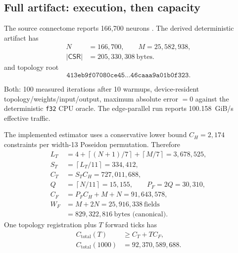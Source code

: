 \documentclass[9pt,twocolumn]{extarticle}
\newcommand{\ceil}[1]{\left\lceil #1\right\rceil}
\newcommand{\code}[1]{\texttt{#1}}
\begin{document}
\subsection{Full artifact: execution, then capacity}

The source connectome reports 166,700 neurons \cite{berg2026malecns}.  The
derived deterministic artifact has
\begin{align}
 N&=166{,}700,\qquad M=25{,}582{,}938,\nonumber\\
 |\mathsf{CSR}|&=205{,}330{,}308\ \text{bytes}.              \label{eq:scale}
\end{align}
and topology root
\begin{equation}
 \code{413eb9f07080ce45...46caaa9a01b0f323}.                 \label{eq:root}
\end{equation}

\begin{table}[t]
\centering
\caption{Full-graph numeric forward pass; this is not proving time.}
\label{tab:executor}
\scriptsize
{}
\vspace{2pt}

\raggedright Both: 100 measured iterations after 10 warmups, device-resident
topology/weights/input/output, maximum absolute error $=0$ against the
deterministic \code{f32} CPU oracle.  The edge-parallel run reports
\SI{100.158}{GiB/s} effective traffic.
\end{table}

The implemented estimator uses a conservative lower bound
$C_H=2,174$ constraints per width-13 Poseidon permutation.  Therefore
\begin{align}
 L_T&=4+\ceil{(N+1)/7}+\ceil{M/7}=3{,}678{,}525,\nonumber\\
 S_T&=\ceil{L_T/11}=334{,}412,\nonumber\\
 C_T&=S_TC_H=727{,}011{,}688,                               \label{eq:top-cap}\\
 Q&=\ceil{N/11}=15{,}155,\qquad P_F=2Q=30{,}310,\nonumber\\
 C_F&=P_FC_H+M+N=91{,}643{,}578,                            \label{eq:fwd-cap}\\
 W_F&=M+2N=25{,}916{,}338\ \text{fields}\nonumber\\
    &=829{,}322{,}816\ \text{bytes (canonical)}.            \label{eq:witness-cap}
\end{align}
One topology registration plus $T$ forward ticks has
\begin{align}
 C_{\mathrm{total}}(T)&\geq C_T+TC_F,\nonumber\\
 C_{\mathrm{total}}(1000)&=92{,}370{,}589{,}688.             \label{eq:total-cap}
\end{align}
\end{document}
